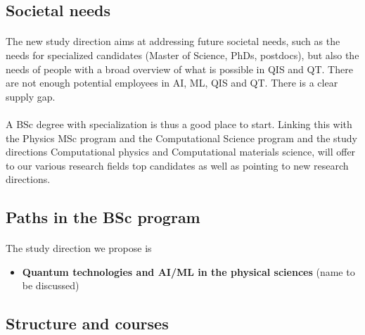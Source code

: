 \documentclass[%
oneside,                 %
final,                   %
10pt]{article}
\begin{document}
\noindent



\subsection*{Societal needs}


\paragraph{}
The new study direction aims at addressing future societal needs, such as the  needs for specialized candidates (Master of Science, PhDs, postdocs), but also the needs of  people with a broad overview of what is possible in  QIS and QT. There are  not enough potential employees in AI, ML, QIS and QT. There is  a clear supply gap.




\paragraph{}
A BSc degree  with specialization  is thus a good place to start. Linking this with the Physics MSc  program and the Computational Science program and the study directions Computational physics and Computational materials science, will offer to our various research fields top candidates as well as pointing to new research directions.



\subsection*{Paths in the BSc program}


\paragraph{}
The study direction we propose is
\begin{itemize}
\item \textbf{Quantum technologies and AI/ML in the physical sciences} (name to be discussed)
\end{itemize}

\noindent



\subsection*{Structure and courses}
\end{document}
